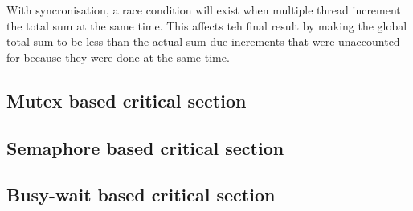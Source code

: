 With syncronisation, a race condition will exist when multiple thread increment the total sum at the same
time. This affects teh final result by making the global total sum to be less than the actual sum due
increments that were unaccounted for because they were done at the same time.


\subsection{Mutex based critical section}

\vspace{0.5cm}



\subsection{Semaphore based critical section}

\vspace{0.5cm}



\subsection{Busy-wait based critical section}

